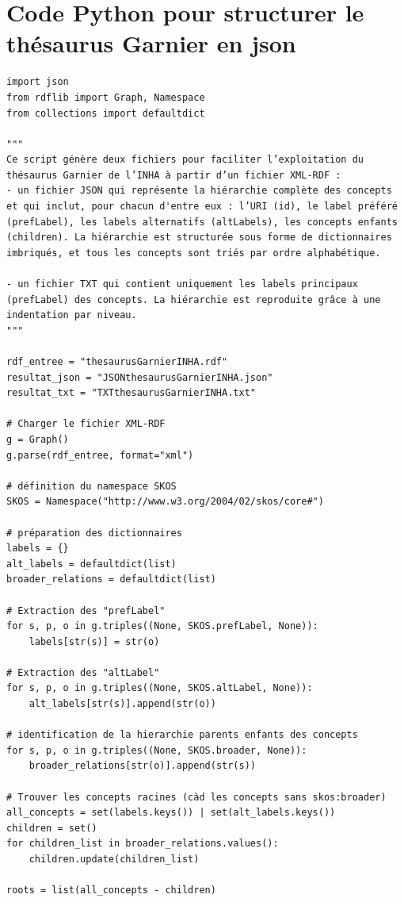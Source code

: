 \section{Code Python pour structurer le thésaurus Garnier en json}
\label{pythonGarnier}

\begin{verbatim}
import json
from rdflib import Graph, Namespace
from collections import defaultdict

"""
Ce script génère deux fichiers pour faciliter l’exploitation du thésaurus Garnier de l’INHA à partir d’un fichier XML-RDF :
- un fichier JSON qui représente la hiérarchie complète des concepts et qui inclut, pour chacun d'entre eux : l’URI (id), le label préféré (prefLabel), les labels alternatifs (altLabels), les concepts enfants (children). La hiérarchie est structurée sous forme de dictionnaires imbriqués, et tous les concepts sont triés par ordre alphabétique.

- un fichier TXT qui contient uniquement les labels principaux (prefLabel) des concepts. La hiérarchie est reproduite grâce à une indentation par niveau.
"""

rdf_entree = "thesaurusGarnierINHA.rdf"
resultat_json = "JSONthesaurusGarnierINHA.json"
resultat_txt = "TXTthesaurusGarnierINHA.txt"

# Charger le fichier XML-RDF
g = Graph()
g.parse(rdf_entree, format="xml")

# définition du namespace SKOS
SKOS = Namespace("http://www.w3.org/2004/02/skos/core#")

# préparation des dictionnaires
labels = {}
alt_labels = defaultdict(list)
broader_relations = defaultdict(list)

# Extraction des "prefLabel"
for s, p, o in g.triples((None, SKOS.prefLabel, None)):
    labels[str(s)] = str(o)

# Extraction des "altLabel"
for s, p, o in g.triples((None, SKOS.altLabel, None)):
    alt_labels[str(s)].append(str(o))

# identification de la hierarchie parents enfants des concepts
for s, p, o in g.triples((None, SKOS.broader, None)):
    broader_relations[str(o)].append(str(s))

# Trouver les concepts racines (càd les concepts sans skos:broader)
all_concepts = set(labels.keys()) | set(alt_labels.keys())
children = set()
for children_list in broader_relations.values():
    children.update(children_list)

roots = list(all_concepts - children)


\end{verbatim}
